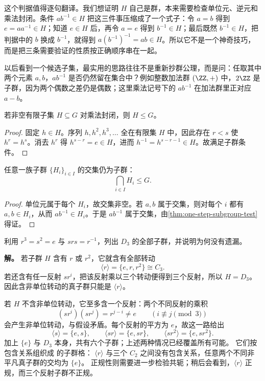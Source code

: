 这个判据值得逐句翻译。我们想证明 $H$ 自己是群，本来需要检查单位元、逆元和乘法封闭。条件 $ab^{-1}\in H$ 把这三件事压缩成了一个式子：令 $a=b$ 得到 $e=aa^{-1}\in H$；知道 $e\in H$ 后，再令 $a=e$ 得到 $b^{-1}\in H$；最后既然 $b^{-1}\in H$，把判据中的 $b$ 换成 $b^{-1}$，就得到 $a(b^{-1})^{-1}=ab\in H$。所以它不是一个神奇技巧，而是把三条需要验证的性质按正确顺序串在一起。

以后看到一个候选子集，最实用的思路往往不是重新抄群公理，而是问：任取其中两个元素 $a,b$，$ab^{-1}$ 是否仍然留在集合中？例如整数加法群 $(\ZZ,+)$ 中，$2\ZZ$ 是子群，因为两个偶数之差仍是偶数；这里乘法记号下的 $ab^{-1}$ 在加法群里正对应 $a-b$。


\begin{corollary}[有限集合的封闭判据]
若非空有限子集 $H\subseteq G$ 对乘法封闭，则 $H\leqslant G$。
\label{cor:finite-closed-subgroup}

\end{corollary}

\begin{proof}
固定 $h\in H$。序列 $h,h^2,h^3,\dots$ 全在有限集 $H$ 中，因此存在 $r<s$ 使 $h^r=h^s$。消去 $h^r$ 得 $h^{s-r}=e\in H$，进而 $h^{-1}=h^{s-r-1}\in H$。故满足子群条件。
\end{proof}

\begin{proposition}[子群的交]
任意一族子群 $\{H_i\}_{i\in I}$ 的交集仍为子群：
\[
\bigcap_{i\in I}H_i\leqslant G.
\]
\label{prop:subgroup-intersection}

\end{proposition}

\begin{proof}
单位元属于每个 $H_i$，故交集非空。若 $a,b$ 属于交集，则对每个 $i$ 都有 $a,b\in H_i$，从而 $ab^{-1}\in H_i$。于是 $ab^{-1}$ 属于交集，由\cref{thm:one-step-subgroup-test} 得证。
\end{proof}

\begin{example}[$D_3$ 的全部子群]
利用 $r^3=s^2=e$ 与 $srs=r^{-1}$，列出 $D_3$ 的全部子群，并说明为何没有遗漏。

\textbf{解。} 若子群 $H$ 含有 $r$ 或 $r^2$，它就含有全部转动
\[
\langle r\rangle=\{e,r,r^2\}\cong C_3.
\]
若还含有任一反射 $sr^i$，把该反射乘以三个转动便得到三个反射，所以 $H=D_3$。
因此含非单位转动的真子群只能是 $\langle r\rangle$。

若 $H$ 不含非单位转动，它至多含一个反射：两个不同反射的乘积
\[
(sr^i)(sr^j)=r^{j-i}\ne e\qquad(i\not\equiv j\pmod3)
\]
会产生非单位转动，与假设矛盾。每个反射的平方为 $e$，故这一路给出
\[
\langle s\rangle=\{e,s\},\qquad
\langle sr\rangle=\{e,sr\},\qquad
\langle sr^2\rangle=\{e,sr^2\}.
\]
加上 $\{e\}$ 与 $D_3$ 本身，共有六个子群；上述两种情况已经覆盖所有可能。
它们按包含关系组织成 的子群格：
$\langle r\rangle$ 与三个 $C_2$ 之间没有包含关系，任意两个不同非平凡真子群的交均为 $\{e\}$。
正规性则需要进一步检验共轭；稍后会看到，$\langle r\rangle$ 正规，而三个反射子群不正规。
\end{example}

